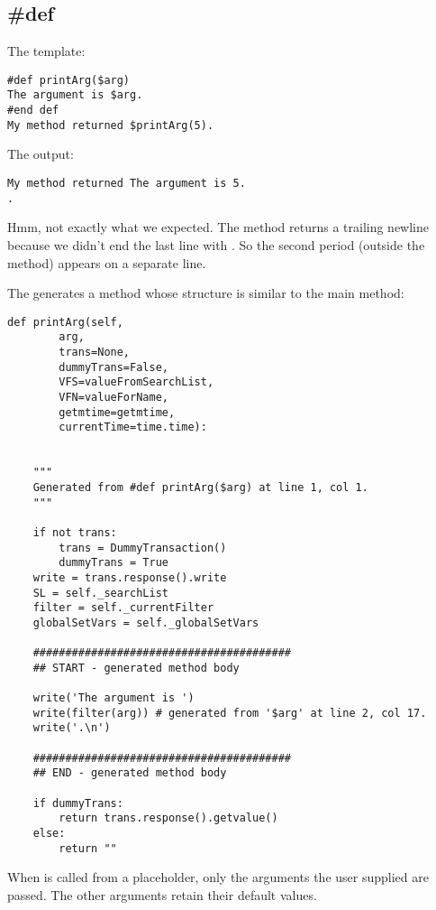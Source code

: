 \subsection{\#def}
\label{inheritanceEtc.def}

The template:
\begin{verbatim}
#def printArg($arg)
The argument is $arg.
#end def
My method returned $printArg(5).
\end{verbatim}

The output:
\begin{verbatim}
My method returned The argument is 5.
.
\end{verbatim}

Hmm, not exactly what we expected.  The method returns a trailing newline
because we didn't end the last line with .  So the second
period (outside the method) appears on a separate line.

The  generates a method  whose structure is similar
to the main method:
\begin{verbatim}
def printArg(self,
        arg,
        trans=None,
        dummyTrans=False,
        VFS=valueFromSearchList,
        VFN=valueForName,
        getmtime=getmtime,
        currentTime=time.time):


    """
    Generated from #def printArg($arg) at line 1, col 1.
    """

    if not trans:
        trans = DummyTransaction()
        dummyTrans = True
    write = trans.response().write
    SL = self._searchList
    filter = self._currentFilter
    globalSetVars = self._globalSetVars
    
    ########################################
    ## START - generated method body
    
    write('The argument is ')
    write(filter(arg)) # generated from '$arg' at line 2, col 17.
    write('.\n')
    
    ########################################
    ## END - generated method body
    
    if dummyTrans:
        return trans.response().getvalue()
    else:
        return ""
\end{verbatim}

When  is called from a placeholder, only the arguments the user
supplied are passed.  The other arguments retain their default values.


